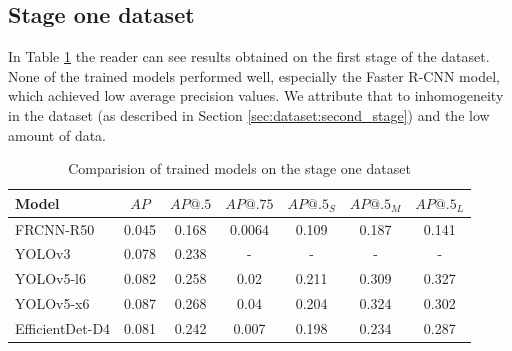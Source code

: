 \subsection{Stage one dataset}
In Table \ref{tab:model_results:stage_one} the reader can see results obtained on the first stage of the dataset. None of the trained models performed well, especially the Faster R-CNN model, which achieved low average precision values. We attribute that to inhomogeneity in the dataset (as described in Section \ref{sec:dataset:second_stage}) and the low amount of data.
\begin{table}[H]
    \centering
    \begin{tabular}{|l|c|c|c|c|c|c|}
        \hline
        Model           & $AP$  & $AP@.5$ & $AP@.75$ & $AP@.5_S$ & $AP@.5_M$ & $AP@.5_L$ \\ \hline
        FRCNN-R50       & 0.045 & 0.168   & 0.0064   & 0.109     & 0.187     & 0.141     \\ \hline
        YOLOv3          & 0.078 & 0.238   & -        & -         & -         & -         \\ \hline
        YOLOv5-l6       & 0.082 & 0.258   & 0.02     & 0.211     & 0.309     & 0.327     \\ \hline
        YOLOv5-x6       & 0.087 & 0.268   & 0.04     & 0.204     & 0.324     & 0.302     \\ \hline
        EfficientDet-D4 & 0.081 & 0.242   & 0.007    & 0.198     & 0.234     & 0.287     \\ \hline
    \end{tabular}
    \caption{Comparision of trained models on the stage one dataset}
    \label{tab:model_results:stage_one}
\end{table}

